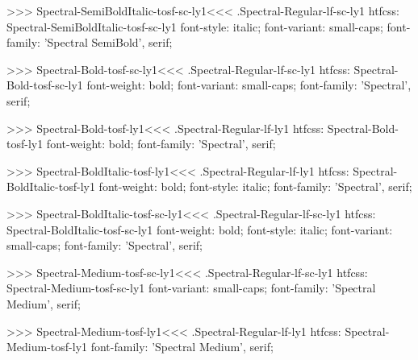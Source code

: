 >>>
\<Spectral-SemiBoldItalic-tosf-sc-ly1\><<<
.Spectral-Regular-lf-sc-ly1
htfcss:  Spectral-SemiBoldItalic-tosf-sc-ly1  font-style: italic; font-variant: small-caps; font-family: 'Spectral SemiBold', serif;

>>>
\<Spectral-Bold-tosf-sc-ly1\><<<
.Spectral-Regular-lf-sc-ly1
htfcss:  Spectral-Bold-tosf-sc-ly1  font-weight: bold; font-variant: small-caps; font-family: 'Spectral', serif;

>>>
\<Spectral-Bold-tosf-ly1\><<<
.Spectral-Regular-lf-ly1
htfcss:  Spectral-Bold-tosf-ly1  font-weight: bold; font-family: 'Spectral', serif;

>>>
\<Spectral-BoldItalic-tosf-ly1\><<<
.Spectral-Regular-lf-ly1
htfcss:  Spectral-BoldItalic-tosf-ly1  font-weight: bold; font-style: italic; font-family: 'Spectral', serif;

>>>
\<Spectral-BoldItalic-tosf-sc-ly1\><<<
.Spectral-Regular-lf-sc-ly1
htfcss:  Spectral-BoldItalic-tosf-sc-ly1  font-weight: bold; font-style: italic; font-variant: small-caps; font-family: 'Spectral', serif;

>>>
\<Spectral-Medium-tosf-sc-ly1\><<<
.Spectral-Regular-lf-sc-ly1
htfcss:  Spectral-Medium-tosf-sc-ly1  font-variant: small-caps; font-family: 'Spectral Medium', serif;

>>>
\<Spectral-Medium-tosf-ly1\><<<
.Spectral-Regular-lf-ly1
htfcss:  Spectral-Medium-tosf-ly1  font-family: 'Spectral Medium', serif;

